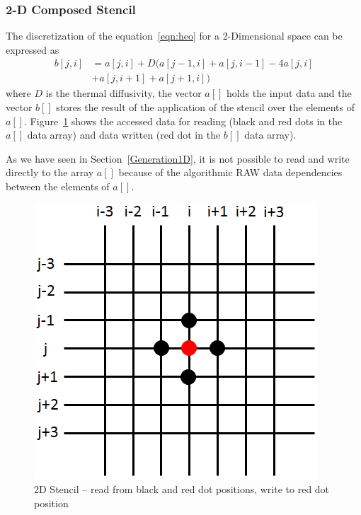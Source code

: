 \documentclass{acm_proc_article-sp}
\begin{document}
\subsubsection{2-D Composed Stencil}
\label{Generation2D}
The discretization of the equation~\eqref{eqn:heo} for a 2-Dimensional space can be expressed as
\begin{equation}
  \begin{split}
    b[j,i] &= a[j,i] + D(a[j-1,i] + a[j,i-1] - 4a[j,i]\\
    &+ a[j,i+1] + a[j+1,i])
  \end{split}
  \label{eqn:hed-2d}
\end{equation}
where $D$ is the thermal diffusivity, the vector $a[]$ holds the input data and the vector $b[]$ stores the result of the application of the stencil over the elements of $a[]$. Figure~\ref{pic:2d-s01} shows the accessed data for reading (black and red dots in the $a[]$ data array) and data written (red dot in the $b[]$ data array).

As we have seen in Section~\ref{Generation1D}, it is not possible to read and write directly to the array $a[]$ because of the algorithmic RAW data dependencies between the elements of $a[]$.
\begin{figure}[ht!]
  \centering
  \includegraphics[scale=0.5]{pics/stencil_grid/2d-s01}
  \caption{2D Stencil -- read from black and red dot positions, write to red dot position}
  \label{pic:2d-s01}
\end{figure}
\end{document}
